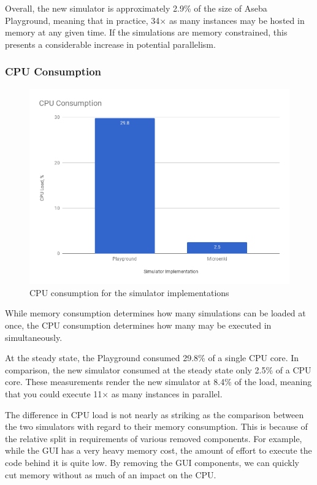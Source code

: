 Overall, the new simulator is approximately 2.9\% of the size of Aseba
Playground, meaning that in practice, 34$\times$ as many instances may be
hosted in memory at any given time. If the simulations are memory constrained,
this presents a considerable increase in potential parallelism.

\subsubsection{CPU Consumption}
\begin{figure}[!h]
    \centering
    \includegraphics[width=\textwidth]{cpu.png}
    \caption{CPU consumption for the simulator implementations}
\end{figure}
While memory consumption determines how many simulations can be loaded at once,
the CPU consumption determines how many may be executed in simultaneously.

At the steady state, the Playground consumed 29.8\% of a single CPU core. In
comparison, the new simulator consumed at the steady state only 2.5\% of a CPU
core. These measurements render the new simulator at 8.4\% of the load, meaning
that you could execute 11$\times$ as many instances in parallel.

The difference in CPU load is not nearly as striking as the comparison between
the two simulators with regard to their memory consumption. This is because of
the relative split in requirements of various removed components. For example,
while the GUI has a very heavy memory cost, the amount of effort to execute the
code behind it is quite low. By removing the GUI components, we can quickly cut
memory without as much of an impact on the CPU.

